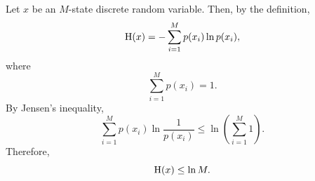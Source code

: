 \subsection{}
\label{1.29}
Let $x$ be an $M$-state discrete random variable.
Then, by the definition,
%
\begin{equation}
{\rm H}(x) 
= 
- 
\sum_{i = 1}^{M} 
p(x_i) 
\ln p(x_i),
\end{equation}
%
where
%
\begin{equation}
\sum_{i = 1}^{M} 
p(x_i) 
= 
1.
\end{equation}
%
By Jensen's inequality,
%
\begin{equation}
\sum_{i = 1}^{M} 
p(x_i) 
\ln \frac{1}{p(x_i)} 
\leq 
\ln 
\left( 
	\sum_{i = 1}^{M} 1 
\right).
\end{equation}
Therefore,
%
\begin{equation}
{\rm H}(x) 
\leq 
\ln M.
\end{equation}
%


